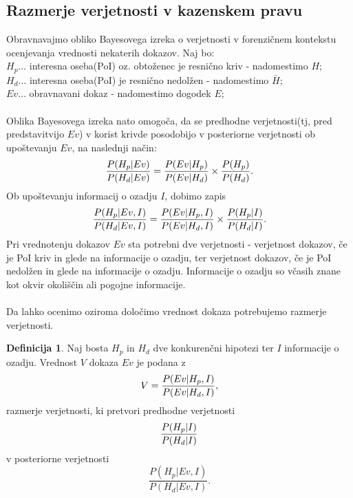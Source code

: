 \documentclass[12pt,a4paper]{amsart}
\theoremstyle{definition} %
\newtheorem{definicija}{Definicija}[section]
\theoremstyle{plain} %
\begin{document}
\subsection{Razmerje verjetnosti v kazenskem pravu}
Obravnavajmo obliko Bayesovega izreka o verjetnosti v forenzičnem kontekstu ocenjevanja vrednosti nekaterih dokazov. Naj bo:\\
$H_p \dots$ interesna oseba(PoI) oz. obtoženec je resnično kriv - nadomestimo $H$;\\
$H_d \dots$ interesna oseba(PoI) je resnično nedolžen - nadomestimo $\bar{H}$;\\
$Ev \dots$ obravnavani dokaz - nadomestimo dogodek $E$;\\\\
Oblika Bayesovega izreka nato omogoča, da se predhodne verjetnosti(tj, pred predstavitvijo $Ev$) v korist krivde posodobijo v posteriorne
verjetnosti ob upoštevanju $Ev$, na naslednji način:
\[
   \frac{P(H_p \lvert Ev)}{P(H_d \lvert Ev)} = \frac{P(Ev \lvert H_p)}{P(Ev \lvert H_d)} \times \frac{P(H_p)}{P(H_d)}. \vspace{2mm}
\]
Ob upoštevanju informacij o ozadju $I$, dobimo zapis
\[
   \frac{P(H_p \lvert Ev, I)}{P(H_d \lvert Ev, I)} = \frac{P(Ev \lvert H_p, I)}{P(Ev \lvert H_d, I)} \times \frac{P(H_p \lvert I)}{P(H_d \lvert I)}. \vspace{2mm}
\]
Pri vrednotenju dokazov $Ev$ sta potrebni dve verjetnosti - verjetnost dokazov, če je PoI kriv in glede na informacije o ozadju, ter
verjetnost dokazov, če je PoI nedolžen in glede na informacije o ozadju. Informacije o ozadju so včasih znane kot okvir okoliščin
ali pogojne informacije. \\\\
Da lahko ocenimo oziroma določimo vrednost dokaza potrebujemo razmerje verjetnosti.
\begin{definicija}
   Naj bosta  $H_p$ in $H_d$ dve konkurenčni hipotezi ter $I$ informacije o ozadju. Vrednost $V$ dokaza $Ev$ je podana z
   \[
       V = \frac{P(Ev \lvert H_p, I)}{P(Ev \lvert H_d, I)}, \vspace{2mm}
   \]
   razmerje verjetnosti, ki pretvori predhodne verjetnosti
   \[
       \frac{P(H_p \lvert I)}{P(H_d \lvert I)} \vspace{2mm}
   \]
   v posteriorne verjetnosti
   \[
       \frac{P(H_p \lvert Ev, I)}{P(H_d \lvert Ev, I)}.
   \]
\end{definicija}

\end{document}
